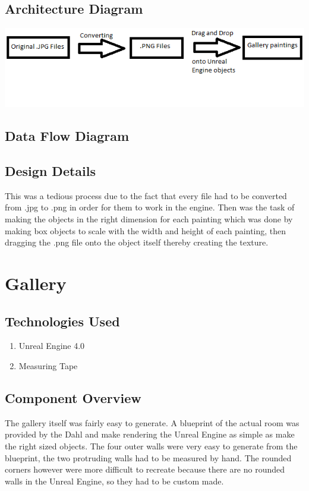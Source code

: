 \subsection{ Architecture  Diagram}
\includegraphics[scale=1.0]{Diagrams/PictureDiagram.png}
 
\subsection{Data Flow Diagram}


\subsection{Design Details}
This was a tedious process due to the fact that every file had to be converted from .jpg to .png in order for them to work in the engine.  Then was the task of making the objects in the right dimension for each painting which was done by making box objects to scale with the width and height of each painting, then dragging the .png file onto the object itself thereby creating the texture.


\section{Gallery }

\subsection{Technologies  Used}
\begin{enumerate}
\item Unreal Engine 4.0
\item Measuring Tape
\end{enumerate}


\subsection{Component  Overview}
The gallery itself was fairly easy to generate.  A blueprint of the actual room was provided by the Dahl and make rendering the Unreal Engine as simple as make the right sized objects.  The four outer walls were very easy to generate from the blueprint, the two protruding walls had to be measured by hand. The rounded corners however were more difficult to recreate because there are no rounded walls in the Unreal Engine, so they had to be custom made.  

